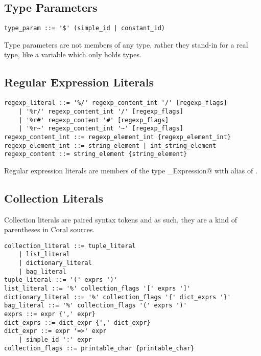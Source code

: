 \subsection{Type Parameters}\label{sec:typeparameterliterals}

\syntax\begin{lstlisting}[mathescape=false]
type_param ::= '$' (simple_id | constant_id)
\end{lstlisting}

Type parameters are not members of any type, rather they stand-in for a real type, like a variable which only holds types. 

\subsection{Regular Expression Literals}\label{sec:regexpliterals}

\syntax\begin{lstlisting}
regexp_literal ::= '%/' regexp_content_int '/' [regexp_flags]
	| '%r/' regexp_content_int '/' [regexp_flags]
	| '%r#' regexp_content '#' [regexp_flags]
	| '%r~' regexp_content_int '~' [regexp_flags]
regexp_content_int ::= regexp_element_int {regexp_element_int}
regexp_element_int ::= string_element | int_string_element
regexp_content ::= string_element {string_element}
\end{lstlisting}

Regular expression literals are members of the type \lstinline@Regular_Expression@ with alias of \lstinline@Regexp@. 

\subsection{Collection Literals}\label{sec:collectionliterals}

Collection literals are paired syntax tokens and as such, they are a kind of parentheses in Coral sources. 

\syntax\begin{lstlisting}
collection_literal ::= tuple_literal
	| list_literal
	| dictionary_literal
	| bag_literal
tuple_literal ::= '(' exprs ')'
list_literal ::= '%' collection_flags '[' exprs ']'
dictionary_literal ::= '%' collection_flags '{' dict_exprs '}'
bag_literal ::= '%' collection_flags '(' exprs ')'
exprs ::= expr {',' expr}
dict_exprs ::= dict_expr {',' dict_expr}
dict_expr ::= expr '=>' expr
	| simple_id ':' expr
collection_flags ::= printable_char {printable_char}
\end{lstlisting}

